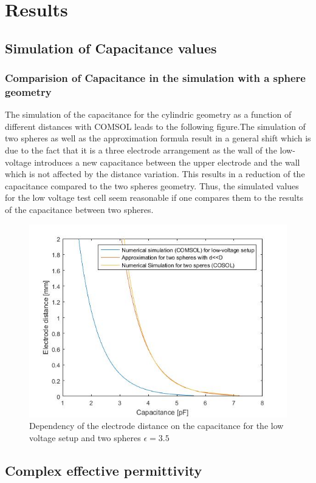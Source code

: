 \chapter{Results}
\section{Simulation of Capacitance values}
\subsection{Comparision of Capacitance in the simulation with a sphere geometry}
The simulation of the capacitance for the cylindric geometry as a function of different distances with COMSOL leads to the following figure.The simulation of two spheres as well as the approximation formula result in a general shift which is due to the fact that it is a three electrode arrangement as the wall of the low-voltage introduces a new capacitance between the upper electrode and the wall which is not affected by the distance variation. This results in a reduction of the capacitance compared to the two spheres geometry. Thus, the simulated values for the low voltage test cell seem reasonable if one compares them to the results of the capacitance between two spheres. \newline 


\begin{figure}[]
	\centering
	\includegraphics[scale=0.3]{figures/Comparison_Low_voltage_Two_spheres}		
	\caption[Kurze Abbildungsbeschreibung]{Dependency of the electrode distance on the capacitance for the low voltage setup and two spheres $\epsilon = 3.5$ } 
	\label{fig.waveforms}
\end{figure}

\section{Complex effective permittivity}
\subsection{}